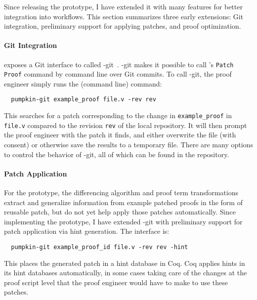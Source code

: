 Since releasing the \sysname prototype, I have extended it with many features
for better integration into  workflows.
This section summarizes three early extensions: Git integration, preliminary support for applying patches,
and proof optimization.

\paragraph{Git Integration} \sysnamelong exposes a Git interface to \sysname
called \sysname-git~\cite{pumpkin-git}.
\sysname-git makes it possible to call \sysname's \lstinline{Patch Proof} command by command line over Git commits.
To call \sysname-git, the proof engineer simply runs the (command line) command:

\begin{lstlisting}
  pumpkin-git example_proof file.v -rev rev
\end{lstlisting}
This searches for a patch corresponding to the change in \lstinline{example_proof} in \lstinline{file.v} compared to the revision \lstinline{rev}
of the local repository. It will then prompt the proof engineer with the patch it finds, and either overwrite the file (with consent) 
or otherwise save the results to a temporary file. There are many options to control the behavior of \sysname-git,
all of which can be found in the repository.

\paragraph{Patch Application}
For the \sysname prototype, the differencing algorithm and proof term transformations extract and generalize information from example patched proofs
in the form of reusable patch, but do not yet help apply those patches automatically.
Since implementing the prototype, I have extended \sysname-git with preliminary support for patch application via hint generation.
The interface is: %

\begin{lstlisting}
  pumpkin-git example_proof_id file.v -rev rev -hint
\end{lstlisting}
This places the generated patch in a hint database in Coq.
Coq applies hints in its hint databases automatically, in some cases taking care of the changes at the proof script level
that the proof engineer would have to make to use these patches.

